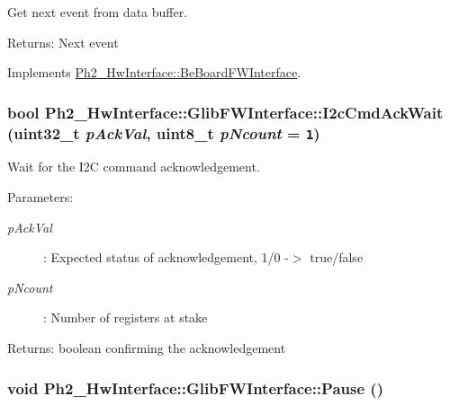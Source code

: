 Get next event from data buffer. 

\begin{Desc}
\item[Returns:]Next event \end{Desc}


Implements \hyperlink{class_ph2___hw_interface_1_1_be_board_f_w_interface_b3b8b839abfd2c3a646015f22db5312a}{Ph2\_\-Hw\-Interface::Be\-Board\-FWInterface}.\hypertarget{class_ph2___hw_interface_1_1_glib_f_w_interface_a43ddde3db1e03ed001bda27a2acf7e1}{
\subsubsection[I2cCmdAckWait]{\setlength{\rightskip}{0pt plus 5cm}bool Ph2\_\-Hw\-Interface::Glib\-FWInterface::I2c\-Cmd\-Ack\-Wait (uint32\_\-t {\em p\-Ack\-Val}, uint8\_\-t {\em p\-Ncount} = {\tt 1})}}
\label{class_ph2___hw_interface_1_1_glib_f_w_interface_a43ddde3db1e03ed001bda27a2acf7e1}


Wait for the I2C command acknowledgement. 

\begin{Desc}
\item[Parameters:]
\begin{description}
\item[{\em p\-Ack\-Val}]: Expected status of acknowledgement, 1/0 -$>$ true/false \item[{\em p\-Ncount}]: Number of registers at stake \end{description}
\end{Desc}
\begin{Desc}
\item[Returns:]boolean confirming the acknowledgement \end{Desc}
\hypertarget{class_ph2___hw_interface_1_1_glib_f_w_interface_05d7f790e0316b51714293e8089086f3}{
\subsubsection[Pause]{\setlength{\rightskip}{0pt plus 5cm}void Ph2\_\-Hw\-Interface::Glib\-FWInterface::Pause ()}}
\label{class_ph2___hw_interface_1_1_glib_f_w_interface_05d7f790e0316b51714293e8089086f3}


